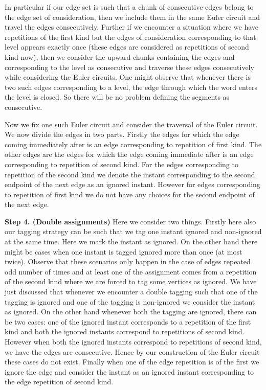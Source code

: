 \documentclass[12pt]{article}
\numberwithin{equation}{section}
\numberwithin{equation}{section}
\theoremstyle{definition}
\renewcommand{\1}{\bf 1}
\begin{document}
In particular if our edge set is such that a chunk of consecutive edges belong to the edge set of consideration, then we include them in the same Euler circuit and travel the edges consecutively. 
Further if we encounter a situation where we have repetitions of the first kind but the edges of consideration corresponding to that level appears exactly once (these edges are considered as repetitions of second kind now), then we consider the upward chunks containing the edges and corresponding to the level as consecutive and traverse these edges consecutively while considering the Euler circuits.  One might observe that whenever there is two such edges corresponding to a level, the edge through which the word enters the level is closed. So there will be no problem defining the segments as consecutive. %


Now we fix one such Euler circuit and consider the traversal of the Euler circuit. We now divide the edges in two parts. Firstly the edges for which the edge coming immediately after is an edge corresponding to repetition of first kind. The other edges are the edges for which the edge coming immediate after is an edge corresponding to repetition of second kind. For the edges corresponding to repetition of the second kind we denote the instant corresponding to the second endpoint of the next edge as an ignored instant. However for edges corresponding to repetition of first kind we do not have any choices for the second endpoint of the next edge. %

\noindent 
\textbf{Step 4. (Double assignments) }
Here we consider two things. Firstly here also our tagging strategy can be such that we tag one instant ignored and non-ignored at the same time. Here we mark the instant as ignored. On the other hand there might be cases when one instant is tagged ignored more than once (at most twice). Observe that these scenarios only happen in the case of edges repeated odd number of times and at least one of the assignment comes from a repetition of the second kind where we are forced to tag some vertices as ignored. We have just discussed that whenever we encounter a double tagging such that one of the tagging is ignored and one of the tagging is non-ignored we consider the instant as ignored. On the other hand whenever both the tagging are ignored, there can be two cases: one of the ignored instant corresponds to a repetition of the first kind and both the ignored instants correspond to repetitions of second kind. However when both the ignored instants correspond to repetitions of second kind, we have the edges are consecutive. Hence by our construction of the Euler circuit these cases do not exist. Finally when one of the edge repetition is of the first we ignore the edge and consider the instant as an ignored instant corresponding to the edge repetition of second kind.
\end{document}
